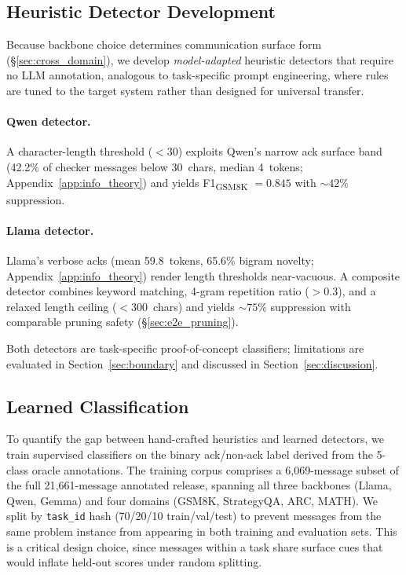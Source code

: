 \subsection{Heuristic Detector Development}
\label{app:heuristic_details}

Because backbone choice determines communication surface form (\S\ref{sec:cross_domain}), we develop \emph{model-adapted} heuristic detectors that require no LLM annotation, analogous to task-specific prompt engineering, where rules are tuned to the target system rather than designed for universal transfer.

\paragraph{Qwen detector.} A character-length threshold ($< 30$) exploits Qwen's narrow ack surface band (42.2\% of checker messages below 30~chars, median 4~tokens; Appendix~\ref{app:info_theory}) and yields F1\textsubscript{GSM8K} $= 0.845$ with ${\sim}42\%$ suppression.

\paragraph{Llama detector.} Llama's verbose acks (mean 59.8~tokens, 65.6\% bigram novelty; Appendix~\ref{app:info_theory}) render length thresholds near-vacuous. A composite detector combines keyword matching, 4-gram repetition ratio ($> 0.3$), and a relaxed length ceiling ($< 300$~chars) and yields ${\sim}75\%$ suppression with comparable pruning safety (\S\ref{sec:e2e_pruning}).

Both detectors are task-specific proof-of-concept classifiers; limitations are evaluated in Section~\ref{sec:boundary} and discussed in Section~\ref{sec:discussion}.

\subsection{Learned Classification}
\label{app:learned_classifier_details}

To quantify the gap between hand-crafted heuristics and learned detectors, we train supervised classifiers on the binary ack/non-ack label derived from the 5-class oracle annotations. The training corpus comprises a 6{,}069-message subset of the full 21{,}661-message annotated release, spanning all three backbones (Llama, Qwen, Gemma) and four domains (GSM8K, StrategyQA, ARC, MATH). We split by \texttt{task\_id} hash (70/20/10 train/val/test) to prevent messages from the same problem instance from appearing in both training and evaluation sets. This is a critical design choice, since messages within a task share surface cues that would inflate held-out scores under random splitting.

